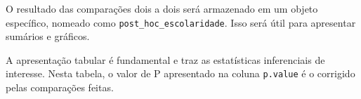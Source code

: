 \documentclass[
]{book}
\newenvironment{Shaded}{\begin{snugshade}}{\end{snugshade}}
\newcommand{\DataTypeTok}[1]{\textcolor[rgb]{0.13,0.29,0.53}{#1}}
\newcommand{\KeywordTok}[1]{\textcolor[rgb]{0.13,0.29,0.53}{\textbf{#1}}}
\newcommand{\NormalTok}[1]{#1}
\newcommand{\OperatorTok}[1]{\textcolor[rgb]{0.81,0.36,0.00}{\textbf{#1}}}
\newcommand{\OtherTok}[1]{\textcolor[rgb]{0.56,0.35,0.01}{#1}}
\newcommand{\StringTok}[1]{\textcolor[rgb]{0.31,0.60,0.02}{#1}}
\begin{document}
O resultado das comparações dois a dois será armazenado em um objeto específico, nomeado como \texttt{post\_hoc\_escolaridade}. Isso será útil para apresentar sumários e gráficos.

\begin{Shaded}
\end{Shaded}

A apresentação tabular é fundamental e traz as estatísticas inferenciais de interesse. Nesta tabela, o valor de P apresentado na coluna \texttt{p.value} é o corrigido pelas comparações feitas.

\begin{Shaded}
\end{Shaded}
\end{document}
